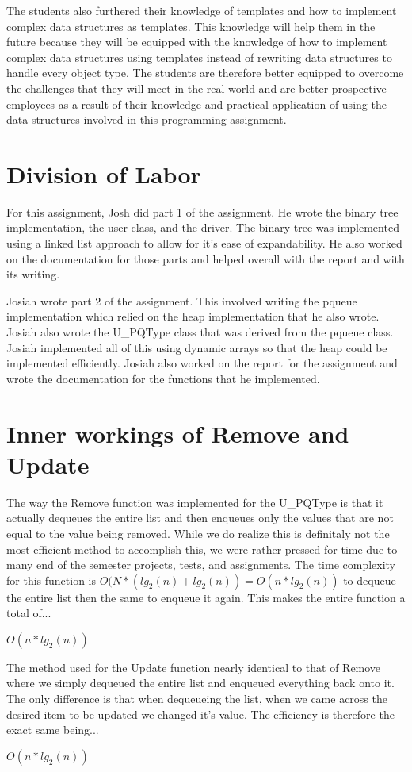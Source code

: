 \documentclass[pdftex, 12pt]{article}
\begin{document}
The students also furthered their knowledge of templates and how to implement complex data structures as templates. This
knowledge will help them in the future because they will be equipped with the knowledge of how to implement complex data
structures using templates instead of rewriting data structures to handle every object type. The students are therefore
better equipped to overcome the challenges that they will meet in the real world and are better prospective employees as
a result of their knowledge and practical application of using the data structures involved in this programming
assignment.

\section{Division of Labor}

For this assignment, Josh did part 1 of the assignment. He wrote the binary tree implementation, the user class, and the
driver. The binary tree was implemented using a linked list approach to allow for it's ease of expandability. He also
worked on the documentation for those parts and helped overall with the report and with its writing.

Josiah wrote part 2 of the assignment. This involved writing the pqueue implementation which relied on the heap
implementation that he also wrote. Josiah also wrote the U\_PQType class that was derived from the pqueue class. Josiah
implemented all of this using dynamic arrays so that the heap could be implemented efficiently. Josiah also worked on
the report for the assignment and wrote the documentation for the functions that he implemented. 

\section{Inner workings of Remove and Update}

The way the Remove function was implemented for the U\_PQType is that it actually dequeues the entire list and then
enqueues only the values that are not equal to the value being removed.  While we do realize this is definitaly not the
most efficient method to accomplish this, we were rather pressed for time due to many end of the semester projects,
tests, and assignments.  The time complexity for this function is $O(N*(lg_2(n)+lg_2(n))=O(n*lg_2(n))$ to dequeue the entire
list then the same to enqueue it again. This makes the entire function a total of...

$O(n*lg_2(n))$

The method used for the Update function nearly identical to that of Remove where we simply dequeued the entire list and
enqueued everything back onto it.  The only difference is that when dequeueing the list, when we came across the desired
item to be updated we changed it's value.  The efficiency is therefore the exact same being...

$O(n*lg_2(n))$
\end{document}
